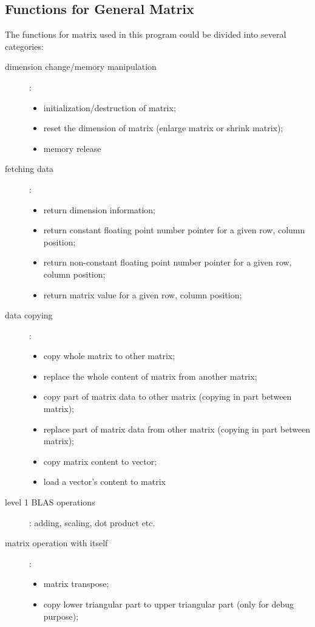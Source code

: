 \subsection{Functions for General Matrix}
%
%
\label{matrix_operations}
The functions for matrix used in this program could be divided into 
several categories:
\begin{description}
  \item [dimension change/memory manipulation]: 
  \begin{itemize}
   \item initialization/destruction of matrix;
	\item reset the dimension of matrix (enlarge matrix or shrink matrix);
	\item memory release
  \end{itemize}
  \item [fetching data]: 
  \begin{itemize}
   \item return dimension information;
   \item return constant floating point number pointer for a given row, column position;
   \item return non-constant floating point number pointer for a given row, column position;
   \item return matrix value for a given row, column position;
  \end{itemize}
 \item [data copying]:
 \begin{itemize}
  \item copy whole matrix to other matrix;
  \item replace the whole content of matrix from another matrix;
  \item copy part of matrix data to other matrix (copying in part between matrix);
  \item replace part of matrix data from other matrix (copying in part between matrix);
  \item copy matrix content to vector;
  \item load a vector's content to matrix
 \end{itemize}
 \item [level 1 BLAS operations]: adding, scaling, dot product etc.
 \item [matrix operation with itself]:
 \begin{itemize}
  \item matrix transpose;
  \item copy lower triangular part to upper triangular part (only for debug purpose);

\end{itemize}
\end{description}
